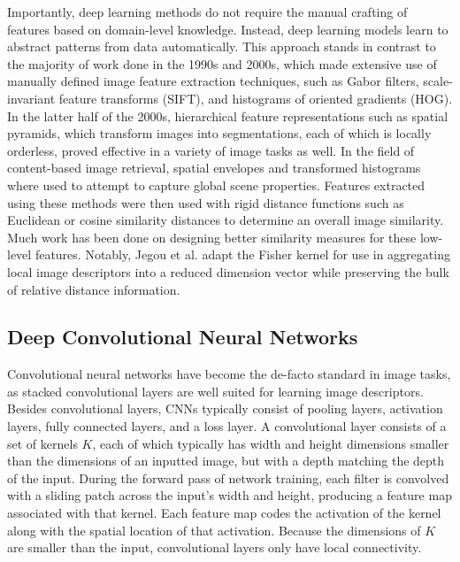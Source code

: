 \documentclass[pageno]{jpaper}
\begin{document}
Importantly, deep learning methods do not require the manual crafting of features based on domain-level knowledge. Instead, deep learning models learn to abstract patterns from data automatically. This approach stands in contrast to the majority of work done in the 1990s and 2000s, which made extensive use of manually defined image feature extraction techniques, such as Gabor filters, scale-invariant feature transforms (SIFT), and histograms of oriented gradients (HOG).\cite{jain1997object}\cite{lowe1999object}\cite{dalal2005histograms} In the latter half of the 2000s, hierarchical feature representations such as spatial pyramids, which transform images into segmentations, each of which is locally orderless, proved effective in a variety of image tasks as well\cite{yang2009linear}\cite{girshick2014rich}\cite{lazebnik2006beyond}. In the field of content-based image retrieval, spatial envelopes and transformed histograms where used to attempt to capture global scene properties\cite{oliva2001modeling}\cite{wu2011centrist}. Features extracted using these methods were then used with rigid distance functions such as Euclidean or cosine similarity distances to determine an overall image similarity. Much work has been done on designing better similarity measures for these low-level features. Notably, Jegou et al.\cite{jegou2012aggregating} adapt the Fisher kernel for use in aggregating local image descriptors into a reduced dimension vector while preserving the bulk of relative distance information. 

\subsection{Deep Convolutional Neural Networks}
Convolutional neural networks have become the de-facto standard in image tasks, as stacked convolutional layers are well suited for learning image descriptors.\cite{karpathy2014large}\cite{krizhevsky2012imagenet}\cite{szegedy2015going} Besides convolutional layers, CNNs typically consist of pooling layers, activation layers, fully connected layers, and a loss layer. A convolutional layer consists of a set of kernels $K$, each of which typically has width and height dimensions smaller than the dimensions of an inputted image, but with a depth matching the depth of the input. During the forward pass of network training, each filter is convolved with a sliding patch across the input's width and height, producing a feature map associated with that kernel. Each feature map codes the activation of the kernel along with the spatial location of that activation. Because the dimensions of $K$ are smaller than the input, convolutional layers only have local connectivity.\\
\end{document}

